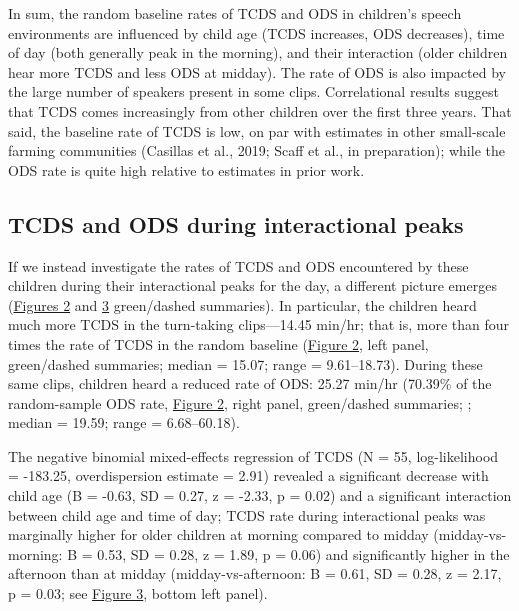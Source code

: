 \documentclass[,man,mask,floatsintext]{apa6}
\begin{document}
In sum, the random baseline rates of TCDS and ODS in children's speech
environments are influenced by child age (TCDS increases, ODS
decreases), time of day (both generally peak in the morning), and their
interaction (older children hear more TCDS and less ODS at midday). The
rate of ODS is also impacted by the large number of speakers present in
some clips. Correlational results suggest that TCDS comes increasingly
from other children over the first three years. That said, the baseline
rate of TCDS is low, on par with estimates in other small-scale farming
communities (Casillas et al., 2019; Scaff et al., in preparation); while
the ODS rate is quite high relative to estimates in prior work.

\subsection{TCDS and ODS during interactional
peaks}\label{tcds-and-ods-during-interactional-peaks}

If we instead investigate the rates of TCDS and ODS encountered by these
children during their interactional peaks for the day, a different
picture emerges (\protect\hyperlink{fig2}{Figures 2} and
\protect\hyperlink{fig3}{3} green/dashed summaries). In particular, the
children heard much more TCDS in the turn-taking clips---14.45 min/hr;
that is, more than four times the rate of TCDS in the random baseline
(\protect\hyperlink{fig2}{Figure 2}, left panel, green/dashed summaries;
median = 15.07; range = 9.61--18.73). During these same clips, children
heard a reduced rate of ODS: 25.27 min/hr (70.39\% of the random-sample
ODS rate, \protect\hyperlink{fig2}{Figure 2}, right panel, green/dashed
summaries; ; median = 19.59; range = 6.68--60.18).

The negative binomial mixed-effects regression of TCDS (N = 55,
log-likelihood = -183.25, overdispersion estimate = 2.91) revealed a
significant decrease with child age (B = -0.63, SD = 0.27, z = -2.33, p
= 0.02) and a significant interaction between child age and time of day;
TCDS rate during interactional peaks was marginally higher for older
children at morning compared to midday (midday-vs-morning: B = 0.53, SD
= 0.28, z = 1.89, p = 0.06) and significantly higher in the afternoon
than at midday (midday-vs-afternoon: B = 0.61, SD = 0.28, z = 2.17, p =
0.03; see \protect\hyperlink{fig3}{Figure 3}, bottom left panel).
\end{document}

